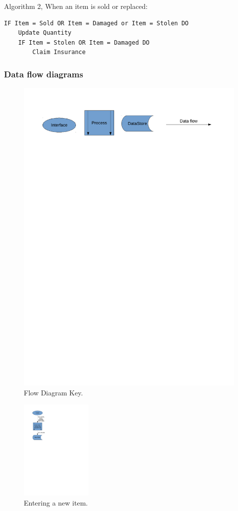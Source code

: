 \documentclass[a4paper,12pt]{report}
\begin{document}
Algorithm 2, When an item is sold or replaced:
\begin{lstlisting}
IF Item = Sold OR Item = Damaged or Item = Stolen DO
    Update Quantity
    IF Item = Stolen OR Item = Damaged DO
        Claim Insurance
\end{lstlisting}

\subsubsection{Data flow diagrams}

\begin{figure}[H]
    \caption{Flow Diagram Key.} \label{fig:print_function_result}
    \includegraphics[width=\textwidth]{./Dataflow/DFD_analysis_key.pdf}
\end{figure}

\begin{figure}[H]
    \caption{Entering a new item.} \label{fig:print_function_result}
    \centerline{\includegraphics[width=130px]{./Dataflow/DFD_analysis_new_item.pdf}}
\end{figure}
\end{document}
